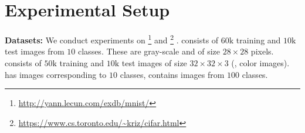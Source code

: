 \section{Experimental Setup}
\label{subsec:supp-experiments-setup}

\textbf{Datasets:} We conduct experiments on \MNIST\footnote{\url{http://yann.lecun.com/exdb/mnist/}} \citep{LecunIEEE1998} and \Cifar\footnote{\url{https://www.cs.toronto.edu/~kriz/cifar.html}} \cite{Krizhevsky2009}. \MNIST consists of $60\text{k}$ training and $10\text{k}$ test images from $10$ classes. These are gray-scale and of size $28 \times 28$ pixels. \Cifar consists of $50\text{k}$ training and $10\text{k}$ test images of size $32\times 32\times 3$ (\ie, color images). \CifarT has images corresponding to $10$ classes, \CifarH contains images from $100$ classes.

